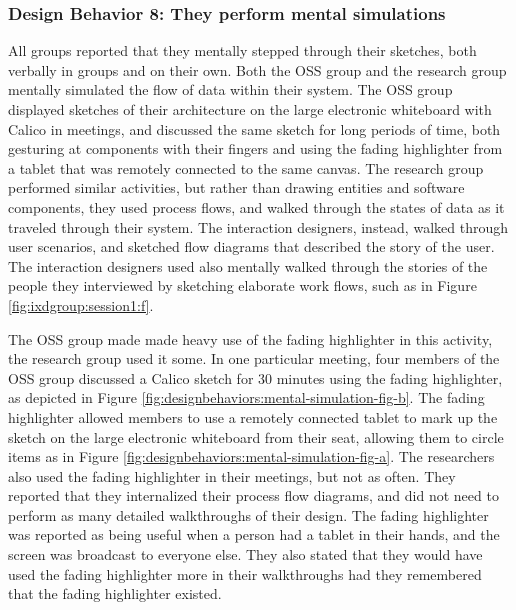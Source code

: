 
\subsubsection{Design Behavior 8: They perform mental simulations}

All groups reported that they mentally stepped through their sketches, both verbally in groups and on their own. Both the OSS group and the research group mentally simulated the flow of data within their system. The OSS group displayed sketches of their architecture on the large electronic whiteboard with Calico in meetings, and discussed the same sketch for long periods of time, both gesturing at components with their fingers and using the fading highlighter from a tablet that was remotely connected to the same canvas. The research group performed similar activities, but rather than drawing entities and software components, they used process flows, and walked through the states of data as it traveled through their system. The interaction designers, instead, walked through user scenarios, and sketched flow diagrams that described the story of the user. The interaction designers used also mentally walked through the stories of the people they interviewed by sketching elaborate work flows, such as in Figure \ref{fig:ixdgroup:session1:f}.

The OSS group made made heavy use of the fading highlighter in this activity, the research group used it some. In one particular meeting, four members of the OSS group discussed a Calico sketch for 30 minutes using the fading highlighter, as depicted in Figure \ref{fig:designbehaviors:mental-simulation-fig-b}. The fading highlighter allowed members to use a remotely connected tablet to mark up the sketch on the large electronic whiteboard from their seat, allowing them to circle items as in Figure \ref{fig:designbehaviors:mental-simulation-fig-a}.  The researchers also used the fading highlighter in their meetings, but not as often. They reported that they internalized their process flow diagrams, and did not need to perform as many detailed walkthroughs of their design. The fading highlighter was reported as being useful when a person had a tablet in their hands, and the screen was broadcast to everyone else. They also stated that they would have used the fading highlighter more in their walkthroughs had they remembered that the fading highlighter existed.

